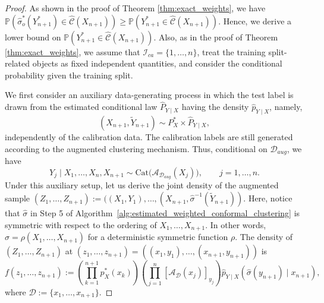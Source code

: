 \documentclass[11pt,letterpaper]{article}
\theoremstyle{definition}
\newcommand{\cC}{\mathcal{C}}
\newcommand{\cD}{\mathcal{D}}
\newcommand{\cI}{\mathcal{I}}
\renewcommand{\P}{\mathbb{P}}
\begin{document}
\begin{proof}
As shown in the proof of Theorem \ref{thm:exact_weights}, we have $\P(\hat{\sigma}_o^\ast(Y_{n + 1}^\ast) \in \hat{\cC}(X_{n + 1})) \ge \P(Y_{n + 1}^\ast \in \hat{\cC}(X_{n + 1}))$. Hence, we derive a lower bound on $\P(Y_{n + 1}^\ast \in \hat{\cC}(X_{n + 1}))$. Also, as in the proof of Theorem \ref{thm:exact_weights}, we assume that $\cI_{ca} = \{1, \ldots, n\}$, treat the training split-related objects as fixed independent quantities, and consider the conditional probability given the training split.

We first consider an auxiliary data-generating process in which the test label is drawn from the estimated conditional law $\widehat{P}_{Y \mid X}$ having the density $\hat{p}_{Y \mid X}$, namely,
\[
    (X_{n+1}, \tilde{Y}_{n+1})
    \sim
    P_X^\ast \times \widehat P_{Y\mid X},
\]
independently of the calibration data. The calibration labels are still generated according to the augmented clustering mechanism. Thus, conditional on $\cD_{aug}$, we have
\[
    Y_j \mid X_1,\ldots,X_n,X_{n+1}
    \sim
    \mathrm{Cat}\bigl(\mathcal A_{\cD_{aug}}(X_j)\bigr),
    \qquad j=1,\ldots,n.
\]
Under this auxiliary setup, let us derive the joint density of the augmented sample $(Z_1,\ldots,Z_{n+1}) := ((X_1, Y_1), \ldots, (X_{n + 1}, \hat{\sigma}^{-1}(\tilde{Y}_{n + 1}))$. Here, notice that $\hat{\sigma}$ in Step 5 of Algorithm~\ref{alg:estimated_weighted_conformal_clustering} is symmetric with respect to the ordering of $X_1, \ldots, X_{n + 1}$. In other words, $\hat{\sigma} = \rho(X_1, \ldots, X_{n + 1})$ for a deterministic symmetric function $\rho$. The density of $(Z_1,\ldots,Z_{n+1})$ at $(z_1, \ldots, z_{n + 1}) = ((x_1, y_1), \ldots, (x_{n + 1}, y_{n + 1}))$ is 
\begin{equation*}
    f(z_1,\ldots,z_{n+1})
    :=
    \left(\prod_{k=1}^{n+1}p_X^\ast(x_k)\right)
    \left(\prod_{j=1}^n [\mathcal A_{\cD}(x_j)]_{y_j}\right)
    \hat{p}_{Y\mid X}(\hat{\sigma}(y_{n + 1}) \mid x_{n+1}),
\end{equation*}
where $\cD := \{x_1, \ldots, x_{n + 1}\}$.


\end{proof}
\end{document}
